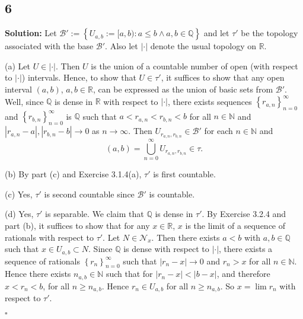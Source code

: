 \documentclass[12pt]{article}
\newcounter{ProofCounter}
\newenvironment{Solution}{\stepcounter{ProofCounter}\textbf{Solution:}}{\hfill$\square$}
\begin{document}
\newpage

\subsection*{6}
\begin{Solution}
  Let $\mathcal{B}' := \left\{ U_{a,b} := [a,b) : a \leq b \wedge a,b\in \mathbb{Q} \right\}$ and let $\tau'$ be the topology associated with the base 
  $\mathcal{B}'$.
  Also let $|\cdot|$ denote the usual topology on $\mathbb{R}$.

  (a) Let $U \in |\cdot|$. Then $U$ is the union of a countable number of open (with respect to $|\cdot|$) intervals. Hence, to show that $U \in \tau'$, it suffices to show that
  any open interval $(a,b)$, $a,b \in \mathbb{R}$, can be expressed as the union of basic sets from $\mathcal{B}'$. Well, since $\mathbb{Q}$ is dense
  in $\mathbb{R}$ with respect to $|\cdot|$, there exists sequences $\left\{ r_{a,n} \right\}_{n=0}^{\infty}$ and $\left\{ r_{b,n}
  \right\}_{n=0}^{\infty}$ is $\mathbb{Q}$ such that $a < r_{a,n} < r_{b,n} < b$ for all $n \in \mathbb{N}$ and $|r_{a,n} - a|, |r_{b,n} - b|
  \rightarrow 0$ as $n\rightarrow\infty$. Then $U_{r_{a,n},r_{b,n}} \in \mathcal{B}'$ for each $n \in \mathbb{N}$ and 
  \[
    (a,b) = \bigcup_{n=0}^{\infty}U_{r_{a,n},r_{b,n}} \in \tau.
  \]

  (b) By part (c) and Exercise 3.1.4(a), $\tau'$ is first countable.

  (c) Yes, $\tau'$ is second countable since $\mathcal{B}'$ is countable.

  (d) Yes, $\tau'$ is separable. We claim that $\mathbb{Q}$ is dense in $\tau'$. By Exercise 3.2.4 and part (b), it suffices to show that for any $x \in
  \mathbb{R}$, $x$ is the limit of a sequence of rationals with respect to $\tau'$. Let $N \in \mathcal{N}_x$. Then there exists $a < b$ with $a,b \in
  \mathbb{Q}$ such that $x \in U_{a,b} \subset N$.
  Since $\mathbb{Q}$ is dense with respect to $|\cdot|$, there exists a sequence of rationals $\left\{ r_n \right\}_{n=0}^{\infty}$ such that 
  $|r_n - x| \rightarrow 0$ and $r_n > x$ for all $n \in \mathbb{N}$. Hence there exists $n_{a,b} \in\mathbb{N}$ such that for $|r_n - x| < |b - x|$,
  and therefore $x < r_n < b$, for all $n
  \geq n_{a,b}$. Hence $r_n \in U_{a,b}$ for all $n \geq n_{a,b}$. So $x = \lim r_n$ with respect to $\tau'$.

\end{Solution}
\end{document}
